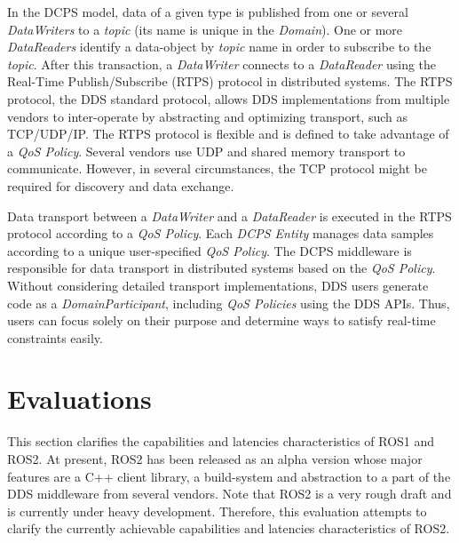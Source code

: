 \documentclass{sig-alternate-05-2015}
\begin{document}
In the DCPS model, data of a given type is published from one or several \emph{DataWriters} to a \emph{topic} (its name is unique in the \emph{Domain}).
One or more \emph{DataReaders} identify a data-object by \emph{topic} name in order to subscribe to the \emph{topic}. 
After this transaction, a \emph{DataWriter} connects to a \emph{DataReader} using the Real-Time Publish/Subscribe (RTPS) protocol \cite{rtps2.2} in distributed systems. 
The RTPS protocol, the DDS standard protocol, allows DDS implementations from multiple vendors to inter-operate by abstracting and optimizing transport, such as TCP/UDP/IP. 
The RTPS protocol is flexible and is defined to take advantage of a \emph{QoS Policy}. 
Several vendors use UDP and shared memory transport to communicate. 
However, in several circumstances, the TCP protocol might be required for discovery and data exchange.

Data transport between a \emph{DataWriter} and a \emph{DataReader} is executed in the RTPS protocol according to a \emph{QoS Policy}. 
Each \emph{DCPS Entity} manages data samples according to a unique user-specified \emph{QoS Policy}. 
The DCPS middleware is responsible for data transport in distributed systems based on the \emph{QoS Policy}. 
Without considering detailed transport implementations, DDS users generate code as a \emph{DomainParticipant}, including \emph{QoS Policies} using the DDS APIs. 
Thus, users can focus solely on their purpose and determine ways to satisfy real-time constraints easily. 

\vspace{-3mm}
\section{Evaluations}
\label{sec:orgheadline2}

This section clarifies the capabilities and latencies characteristics of ROS1 and ROS2. 
At present, ROS2 has been released as an alpha version whose major features are a C++ client library, a build-system and abstraction to a part of the DDS middleware from several vendors. 
Note that ROS2 is a very rough draft and is currently under heavy development. 
Therefore, this evaluation attempts to clarify the currently achievable capabilities and latencies characteristics of ROS2.
\end{document}
